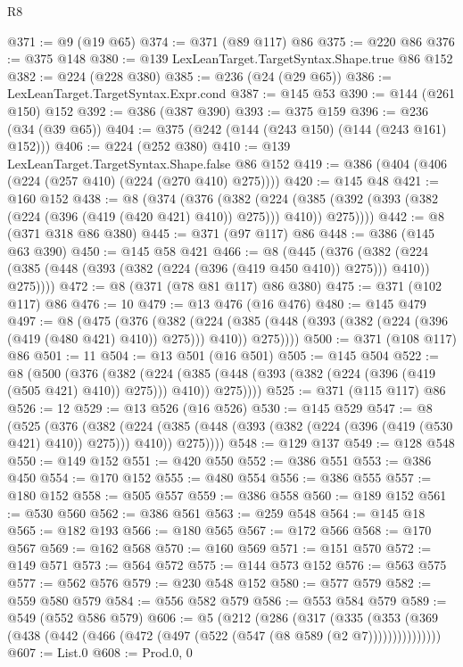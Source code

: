 \begin{lexlean}{R8}
\begin{coremodule}
{{{{{{{{{{{{{{{{{{{{{{{{{{{{{{{{{{{{{{{{@371 := @9 (@19 @65)
@374 := @371 (@89 @117) @86
@375 := @220 @86
@376 := @375 @148
@380 := @139 LexLeanTarget.TargetSyntax.Shape.true @86 @152
@382 := @224 (@228 @380)
@385 := @236 (@24 (@29 @65))
@386 := LexLeanTarget.TargetSyntax.Expr.cond
@387 := @145 @53
@390 := @144 (@261 @150) @152
@392 := @386 (@387 @390)
@393 := @375 @159
@396 := @236 (@34 (@39 @65))
@404 := @375 (@242 (@144 (@243 @150) (@144 (@243 @161) @152)))
@406 := @224 (@252 @380)
@410 := @139 LexLeanTarget.TargetSyntax.Shape.false @86 @152
@419 := @386 (@404 (@406 (@224 (@257 @410) (@224 (@270 @410) @275))))
@420 := @145 @48
@421 := @160 @152
@438 := @8
    (@374
      (@376
        (@382
          (@224 (@385 (@392 (@393 (@382 (@224 (@396 (@419 (@420 @421) @410)) @275))) @410)) @275))))
@442 := @8 (@371 @318 @86 @380)
@445 := @371 (@97 @117) @86
@448 := @386 (@145 @63 @390)
@450 := @145 @58 @421
@466 := @8
    (@445
      (@376
        (@382 (@224 (@385 (@448 (@393 (@382 (@224 (@396 (@419 @450 @410)) @275))) @410)) @275))))
@472 := @8 (@371 (@78 @81 @117) @86 @380)
@475 := @371 (@102 @117) @86
@476 := 10
@479 := @13 @476 (@16 @476)
@480 := @145 @479
@497 := @8
    (@475
      (@376
        (@382
          (@224 (@385 (@448 (@393 (@382 (@224 (@396 (@419 (@480 @421) @410)) @275))) @410)) @275))))
@500 := @371 (@108 @117) @86
@501 := 11
@504 := @13 @501 (@16 @501)
@505 := @145 @504
@522 := @8
    (@500
      (@376
        (@382
          (@224 (@385 (@448 (@393 (@382 (@224 (@396 (@419 (@505 @421) @410)) @275))) @410)) @275))))
@525 := @371 (@115 @117) @86
@526 := 12
@529 := @13 @526 (@16 @526)
@530 := @145 @529
@547 := @8
    (@525
      (@376
        (@382
          (@224 (@385 (@448 (@393 (@382 (@224 (@396 (@419 (@530 @421) @410)) @275))) @410)) @275))))
@548 := @129 @137
@549 := @128 @548
@550 := @149 @152
@551 := @420 @550
@552 := @386 @551
@553 := @386 @450
@554 := @170 @152
@555 := @480 @554
@556 := @386 @555
@557 := @180 @152
@558 := @505 @557
@559 := @386 @558
@560 := @189 @152
@561 := @530 @560
@562 := @386 @561
@563 := @259 @548
@564 := @145 @18
@565 := @182 @193
@566 := @180 @565
@567 := @172 @566
@568 := @170 @567
@569 := @162 @568
@570 := @160 @569
@571 := @151 @570
@572 := @149 @571
@573 := @564 @572
@575 := @144 @573 @152
@576 := @563 @575
@577 := @562 @576
@579 := @230 @548 @152
@580 := @577 @579
@582 := @559 @580 @579
@584 := @556 @582 @579
@586 := @553 @584 @579
@589 := @549 (@552 @586 @579)
@606 := @5
    (@212
      (@286
        (@317
          (@335 (@353 (@369 (@438 (@442 (@466 (@472 (@497 (@522 (@547 (@8 @589 (@2 @7)))))))))))))))
@607 := List.{0}
@608 := Prod.{0, 0}
}}}}}}}}}}}}}}}}}}}}}}}}}}}}}}}}}}}}}}}}
\end{coremodule}
\end{lexlean}
